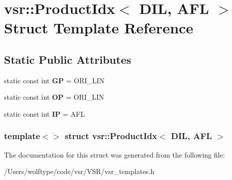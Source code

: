 \hypertarget{structvsr_1_1_product_idx_3_01_d_i_l_00_01_a_f_l_01_4}{\section{vsr\-:\-:Product\-Idx$<$ D\-I\-L, A\-F\-L $>$ Struct Template Reference}
\label{structvsr_1_1_product_idx_3_01_d_i_l_00_01_a_f_l_01_4}
}
\subsection*{Static Public Attributes}
\begin{DoxyCompactItemize}
\item 
\hypertarget{structvsr_1_1_product_idx_3_01_d_i_l_00_01_a_f_l_01_4_af700ce15e6a283df1a729d16709051c7}{static const int {\bfseries G\-P} = O\-R\-I\-\_\-\-L\-I\-N}\label{structvsr_1_1_product_idx_3_01_d_i_l_00_01_a_f_l_01_4_af700ce15e6a283df1a729d16709051c7}

\item 
\hypertarget{structvsr_1_1_product_idx_3_01_d_i_l_00_01_a_f_l_01_4_a6458353e05441e539432515c114ce60d}{static const int {\bfseries O\-P} = O\-R\-I\-\_\-\-L\-I\-N}\label{structvsr_1_1_product_idx_3_01_d_i_l_00_01_a_f_l_01_4_a6458353e05441e539432515c114ce60d}

\item 
\hypertarget{structvsr_1_1_product_idx_3_01_d_i_l_00_01_a_f_l_01_4_a9320cde7e8fd0abd3d073fc24255cdf8}{static const int {\bfseries I\-P} = A\-F\-L}\label{structvsr_1_1_product_idx_3_01_d_i_l_00_01_a_f_l_01_4_a9320cde7e8fd0abd3d073fc24255cdf8}

\end{DoxyCompactItemize}
\subsubsection*{template$<$$>$ struct vsr\-::\-Product\-Idx$<$ D\-I\-L, A\-F\-L $>$}



The documentation for this struct was generated from the following file\-:\begin{DoxyCompactItemize}
\item 
/\-Users/wolftype/code/vsr/\-V\-S\-R/vsr\-\_\-templates.\-h\end{DoxyCompactItemize}
